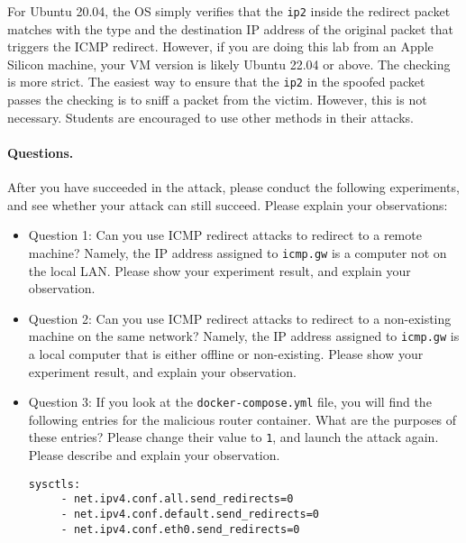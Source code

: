 For Ubuntu 20.04, the OS simply verifies that
the \texttt{ip2} inside the redirect packet matches with the
type and the destination IP address of the original packet 
that triggers the ICMP redirect. However, 
if you are doing this lab from an Apple Silicon machine, your VM version is likely 
Ubuntu 22.04 or above. 
The checking is more strict. 
The easiest way to ensure that the \texttt{ip2} in
the spoofed packet passes the checking is to sniff a packet from the victim. 
However, this is not necessary. Students are encouraged to 
use other methods in their attacks. 


\paragraph{Questions.} After you have succeeded in the attack, please 
conduct the following experiments, and see whether your attack can 
still succeed. Please explain your observations:

\begin{itemize}
\item Question 1: Can you use ICMP redirect attacks to redirect to a remote machine? Namely,
the IP address assigned to \texttt{icmp.gw} is a computer not on the local LAN. 
Please show your experiment result, and explain your observation.  

\item Question 2: Can you use ICMP redirect attacks to redirect to a non-existing machine on
the same network? Namely, the IP address assigned to \texttt{icmp.gw} is a local computer that
is either offline or non-existing. 
Please show your experiment result, and explain your observation.  

\item Question 3: If you look at the \texttt{docker-compose.yml} file, you will find the 
following entries for the malicious router container. What are the purposes
of these entries? Please change their value to \texttt{1}, and launch the attack again. 
Please describe and explain your observation. 

\begin{lstlisting}
sysctls:
     - net.ipv4.conf.all.send_redirects=0
     - net.ipv4.conf.default.send_redirects=0
     - net.ipv4.conf.eth0.send_redirects=0
\end{lstlisting}
 
\end{itemize}





